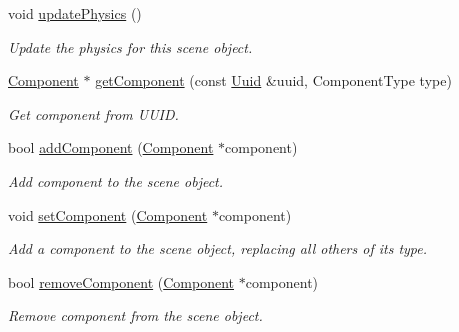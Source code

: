 \begin{Indent}
\begin{DoxyCompactItemize}
void \mbox{\hyperlink{classrev_1_1_scene_object_a77bde553707421d790814c7f9f0f55fc}{update\+Physics}} ()
\begin{DoxyCompactList}\small\item\em Update the physics for this scene object. \end{DoxyCompactList}\item 
\mbox{\label{classrev_1_1_scene_object_a05dffa8f0973f5f25ec3ce61a8818a35}} 
\mbox{\hyperlink{classrev_1_1_component}{Component}} $\ast$ \mbox{\hyperlink{classrev_1_1_scene_object_a05dffa8f0973f5f25ec3ce61a8818a35}{get\+Component}} (const \mbox{\hyperlink{classrev_1_1_uuid}{Uuid}} \&uuid, Component\+Type type)
\begin{DoxyCompactList}\small\item\em Get component from U\+U\+ID. \end{DoxyCompactList}\item 
bool \mbox{\hyperlink{classrev_1_1_scene_object_a13d00e54d798f6fc9839d4bf5150ba4b}{add\+Component}} (\mbox{\hyperlink{classrev_1_1_component}{Component}} $\ast$component)
\begin{DoxyCompactList}\small\item\em Add component to the scene object. \end{DoxyCompactList}\item 
\mbox{\label{classrev_1_1_scene_object_ae0e7260ad5c4376a2cf98824a5b73e01}} 
void \mbox{\hyperlink{classrev_1_1_scene_object_ae0e7260ad5c4376a2cf98824a5b73e01}{set\+Component}} (\mbox{\hyperlink{classrev_1_1_component}{Component}} $\ast$component)
\begin{DoxyCompactList}\small\item\em Add a component to the scene object, replacing all others of it\textquotesingle{}s type. \end{DoxyCompactList}\item 
bool \mbox{\hyperlink{classrev_1_1_scene_object_abb059633877c5d136545d7a34aa3cbdb}{remove\+Component}} (\mbox{\hyperlink{classrev_1_1_component}{Component}} $\ast$component)
\begin{DoxyCompactList}\small\item\em Remove component from the scene object. \end{DoxyCompactList}\item 
\mbox{\label{classrev_1_1_scene_object_a9216d4fa30e4c96b7c14b6d0ab890783}} 

\end{DoxyCompactItemize}
\end{Indent}
